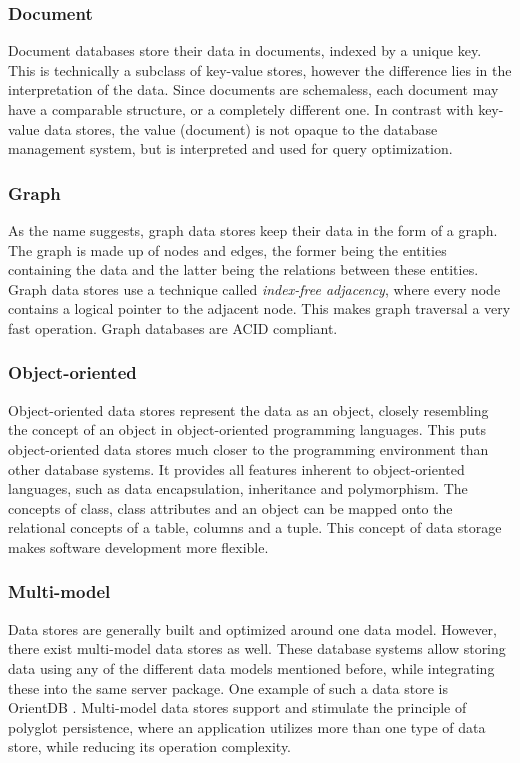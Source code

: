 \subsubsection{Document}
\label{sec:document}

Document databases store their data in documents, indexed by a unique key. This is technically a subclass of key-value stores, however the difference lies in the interpretation of the data. Since documents are schemaless, each document may have a comparable structure, or a completely different one. In contrast with key-value data stores, the value (document) is not opaque to the database management system, but is interpreted and used for query optimization.

\subsubsection{Graph}
\label{sec:graph}

As the name suggests, graph data stores keep their data in the form of a graph. The graph is made up of nodes and edges, the former being the entities containing the data and the latter being the relations between these entities. Graph data stores use a technique called \textit{index-free adjacency}, where every node contains a logical pointer to the adjacent node. This makes graph traversal a very fast operation. Graph databases are ACID compliant.

\subsubsection{Object-oriented}
\label{sec:object-oriented}

Object-oriented data stores represent the data as an object, closely resembling the concept of an object in object-oriented programming languages. This puts object-oriented data stores much closer to the programming environment than other database systems. It provides all features inherent to object-oriented languages, such as data encapsulation, inheritance and polymorphism. The concepts of class, class attributes and an object can be mapped onto the relational concepts of a table, columns and a tuple. This concept of data storage makes software development more flexible.


\subsubsection{Multi-model}
\label{sec:multi-model}
Data stores are generally built and optimized around one data model. However, there exist multi-model data stores as well. These database systems allow storing data using any of the different data models mentioned before, while integrating these into the same server package. One example of such a data store is OrientDB \autocite{OrientDB2010}. Multi-model data stores support and stimulate the principle of polyglot persistence, where an application utilizes more than one type of data store, while reducing its operation complexity.\\

